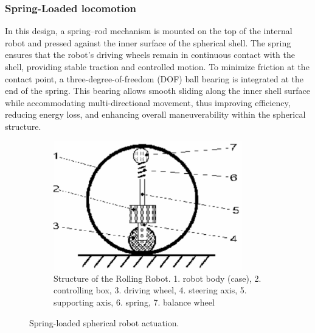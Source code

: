 \documentclass[english, bachelor, utf8]{base/thesis_telematics}
\begin{document}
\subsubsection{Spring-Loaded locomotion}
In this design, a spring–rod mechanism is mounted on the top of the internal robot and pressed against the inner surface of the spherical shell. 
The spring ensures that the robot’s driving wheels remain in continuous contact with the shell, providing stable traction and controlled motion. 
To minimize friction at the contact point, a three-degree-of-freedom (DOF) ball bearing is integrated at the end of the spring. 
This bearing allows smooth sliding along the inner shell surface while accommodating multi-directional movement, thus improving efficiency, reducing energy loss, and enhancing overall maneuverability within the spherical structure.~\cite{old_spring_paper,flywheel_hamaster_explanation,SpheriDrive}


\begin{figure}[ht]
    \centering
\begin{subfigure}{0.48\textwidth}
    \centering
    \includegraphics[width=0.9\textwidth]{pics/spring_2d.png}
    \caption{Structure of the Rolling Robot. 1. robot body (case), 2. controlling box, 3. driving wheel, 4. steering axis, 5. supporting axis, 6. spring, 7. balance wheel~\cite{old_spring_paper}}
    \label{fig:spring_2D_top}
\end{subfigure}

\caption{Spring-loaded spherical robot actuation.}
\label{fig:spring_sphere}
\end{figure}
\end{document}
